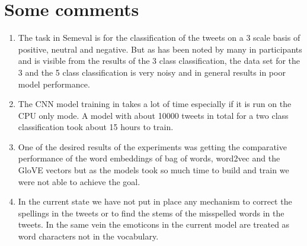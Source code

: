 \documentclass[conference]{IEEEtran}
\begin{document}
\appendices
\section*{Some comments}
\begin{enumerate}
\item
The task in Semeval is for the classification of the tweets on a 3 scale basis of positive, neutral and negative. But as has been noted by many in participants and is visible from the results of the 3 class classification, the data set for the 3 and the 5 class classification is very noisy and in general results in poor model performance.
\item
The CNN model training in takes a lot of time especially if it is run on the CPU only mode. A model with about 10000 tweets in total for a two class classification took about 15 hours to train.
\item
One of the desired results of the experiments was getting the comparative performance of the word embeddings of bag of words, word2vec and the GloVE vectors but as the models took so much time to build and train we were not able to achieve the goal.
\item
In the current state we have not put in place any mechanism to correct the spellings in the tweets or to find the stems of the misspelled words in the tweets. In the same vein the emoticons in the current model are treated as word characters not in the vocabulary.


\end{enumerate}






\ifCLASSOPTIONcaptionsoff
  \newpage
\fi




\end{document}
